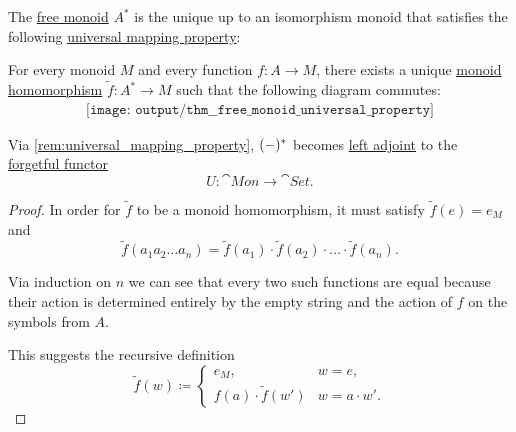 \begin{theorem}\label{thm:free_monoid_universal_property}
  The \hyperref[def:free_monoid]{free monoid} \( A^* \) is the unique up to an isomorphism monoid that satisfies the following \hyperref[rem:universal_mapping_property]{universal mapping property}:
  \begin{displayquote}
    For every monoid \( M \) and every function \( f: A \to M \), there exists a unique \hyperref[def:monoid/homomorphism]{monoid homomorphism} \( \widetilde{f}: A^* \to M \) such that the following diagram commutes:
    \begin{equation}\label{eq:thm:free_monoid_universal_property/diagram}
      \begin{aligned}
        \texttt{[image: output/thm\_\_free\_monoid\_universal\_property]}
      \end{aligned}
    \end{equation}
  \end{displayquote}
\end{theorem}
\begin{comments}
  \item Via \cref{rem:universal_mapping_property}, \( (\Anon*)^* \) becomes \hyperref[def:category_adjunction]{left adjoint} to the \hyperref[def:concrete_category]{forgetful functor}
  \begin{equation*}
    U: \cat{Mon} \to \cat{Set}.
  \end{equation*}
\end{comments}
\begin{proof}
  In order for \( \widetilde{f} \) to be a monoid homomorphism, it must satisfy \( \widetilde{f}(e) = e_M \) and
  \begin{equation*}
    \widetilde{f}(a_1 a_2 \ldots a_n) = \widetilde{f}(a_1) \cdot \widetilde{f}(a_2) \cdot \ldots \cdot \widetilde{f}(a_n).
  \end{equation*}

  Via induction on \( n \) we can see that every two such functions are equal because their action is determined entirely by the empty string and the action of \( f \) on the symbols from \( A \).

  This suggests the recursive definition
  \begin{equation*}
    \widetilde{f}(w) \coloneqq \begin{cases}
      e_M,                         &w = e, \\
      f(a) \cdot \widetilde{f}(w') &w = a \cdot w'.
    \end{cases}
  \end{equation*}
\end{proof}

